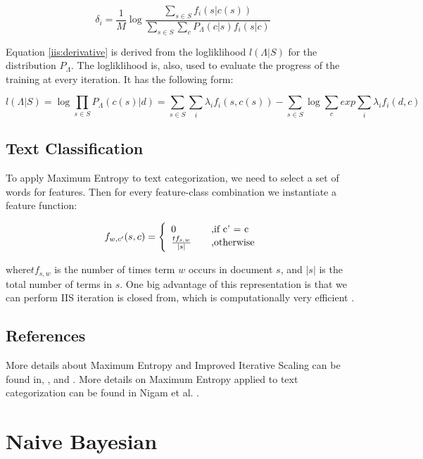 \documentclass{report}
\begin{document}
\begin{equation}
\label{iis:delta}
\delta_i  = \frac{1}{M} \log \frac{\sum_{s \in S} f_i (s|c(s))}{\sum_{s \in S}\sum_{c} P_{\Lambda}(c|s) f_i(s|c) }
\end{equation}

Equation \ref{iis:derivative} is derived from the logliklihood $l(\Lambda|S)$ for the distribution $P_{\Lambda}$. The logliklihood is, also, used to evaluate the progress of the training at every iteration. It has the following form:

\[
l(\Lambda|S) = \log \prod_{s \in S} P_{\Lambda}(c(s)|d) = \sum_{s \in S} \sum_{i} \lambda_i f_i(s, c(s)) - \sum_{s \in S} \log \sum_{c} exp \sum_{i} \lambda_i f_i(d,c)
\]

\subsection{Text Classification}

To apply Maximum Entropy to text categorization, we need to select a set of words for features. Then for every feature-class combination we instantiate a feature function:

\[
f_{w,c'}(s,c) =  \left\{ 
  \begin{array}{l l}
    0 & \quad \text{,if c' = c}\\
    \frac{tf_{s,w}}{|s|} & \quad \text{,otherwise}\\
  \end{array} \right.
\]

where$ tf_{s,w}$ is the number of times term $w$ occurs in document $s$, and $|s|$ is the total number of terms in $s$.
One big advantage of this representation is that we can perform IIS iteration is closed from, which is computationally very efficient \cite{oai:CiteSeerPSU:93050}.

\subsection{References}

More details about Maximum Entropy and Improved Iterative Scaling can be found in\cite{berger_a1-etal:1996a}, \cite{berger:gental}, \cite{manning99} and \cite{oai:CiteSeerPSU:93050}. More details on Maximum Entropy applied to text categorization can be found in Nigam et al. \cite{oai:CiteSeerPSU:93050}.

\section{Naive Bayesian}
\end{document}
